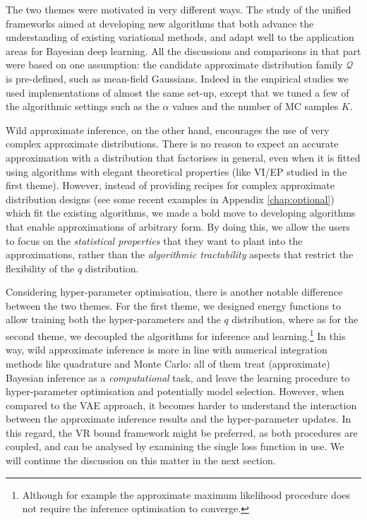The two themes were motivated in very different ways. The study of the unified frameworks aimed at developing new algorithms that both advance the understanding of existing variational methods, and adapt well to the application areas for Bayesian deep learning. All the discussions and comparisons in that part were based on one assumption: the candidate approximate distribution family $\mathcal{Q}$ is pre-defined, such as mean-field Gaussians. Indeed in the empirical studies we used implementations of almost the same set-up, except that we tuned a few of the algorithmic settings such as the $\alpha$ values and the number of MC samples $K$.

Wild approximate inference, on the other hand, encourages the use of very complex approximate distributions. There is no reason to expect an accurate approximation with a distribution that factorises in general, even when it is fitted using algorithms with elegant theoretical properties (like VI/EP studied in the first theme). However, instead of providing recipes for complex approximate distribution designs (see some recent examples in Appendix \ref{chap:optional}) which fit the existing algorithms, we made a bold move to developing algorithms that enable approximations of arbitrary form. By doing this, we allow the users to focus on the \emph{statistical properties} that they want to plant into the approximations, rather than the \emph{algorithmic tractability} aspects that restrict the flexibility of the $q$ distribution. 

Considering hyper-parameter optimisation, there is another notable difference between the two themes. For the first theme, we designed energy functions to allow training both the hyper-parameters and the $q$ distribution, where as for the second theme, we decoupled the algorithms for inference and learning.\footnote{Although for example the approximate maximum likelihood procedure does not require the inference optimisation to converge.} In this way, wild approximate inference is more in line with numerical integration methods like quadrature and Monte Carlo: all of them treat (approximate) Bayesian inference as a \emph{computational} task, and leave the learning procedure to hyper-parameter optimisation and potentially model selection. However, when compared to the VAE approach, it becomes harder to understand the interaction between the approximate inference results and the hyper-parameter updates. In this regard, the VR bound framework might be preferred, as both procedures are coupled, and can be analysed by examining the single loss function in use. We will continue the discussion on this matter in the next section.


